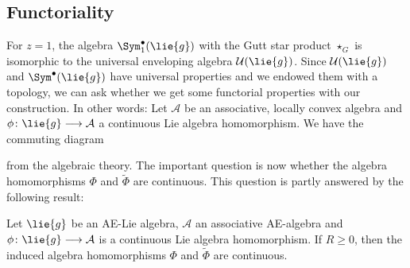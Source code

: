 \subsection{Functoriality}

For $z = 1$, the algebra $\Sym_1^{\bullet}(\lie{g})$ with the 
Gutt star product $\star_G$ is isomorphic to the universal enveloping 
algebra $\mathcal{U}(\lie{g})$. Since $\mathcal{U}(\lie{g})$ and 
$\Sym^{\bullet}(\lie{g})$ have universal properties and we 
endowed them with a topology, we can ask whether we get some functorial
properties with our construction. In other words: Let $\mathcal{A}$ be
an associative, locally convex algebra and $\phi \colon \lie{g}
\longrightarrow \mathcal{A}$ a continuous Lie algebra homomorphism. We
have the commuting diagram
\begin{center}
\end{center}
from the algebraic theory. The important question is now whether the
algebra homomorphisms $\Phi$ and $\widetilde{\Phi}$ are continuous. This 
question is partly answered by the following result:
\begin{proposition}
    \label{Thm:LCAna:Semi-functoriality}%
    Let $\lie{g}$ be an AE-Lie algebra, $\mathcal{A}$ an associative
    AE-algebra and $\phi \colon \lie{g} \longrightarrow \mathcal{A}$
    is a continuous Lie algebra homomorphism.  If $R \geq 0$, then the
    induced algebra homomorphisms $\Phi$ and $\widetilde{\Phi}$ are
    continuous.
\end{proposition}
